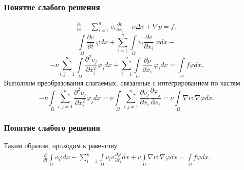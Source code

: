 \documentclass[10pt, pdf, hyperref={unicode}]{beamer}
\begin{document}
  \begin{frame}
    \frametitle{Понятие слабого решения}
    \begin{center}
      \begin{minipage}[h]{0.97\linewidth}
        \begin{equation*}
          \begin{gathered}
            \frac{\partial v}{\partial t}+\sum_{i=1}^nv_i\frac{\partial v}{\partial x_i}-\nu\Delta v+\nabla p=f;
          \end{gathered}
        \end{equation*}
        $$\int\limits_\Omega \frac{\partial v}{\partial t}\ \varphi dx+\sum_{i=1}^n\int\limits_\Omega v_i\frac{\partial v}{\partial x_i}\ \varphi dx-$$
        $$-\nu \sum_{i, j=1}^n\int\limits_\Omega\frac{\partial^2 v_j}{\partial x^{2}_i} \varphi_j dx+
        \sum_{i=1}^n\int\limits_\Omega \frac{\partial p}{\partial x_i}\ \varphi_idx=\int\limits_\Omega f\varphi dx.$$
        Выполним преобразования слагаемых, связанные с интегрированием по частям
        $$-\nu\int\limits_\Omega \sum_{i,j=1}^{n}\frac{\partial^2 v_j}{\partial x^{2}_i}\varphi_j dx=
        \nu\int\limits_\Omega\sum_{i, j=1}^{n}\frac{\partial v_j}{\partial x_i}\frac{\partial \varphi_j}{\partial x_i}=\nu\int\limits_\Omega \nabla v:\nabla\varphi dx.$$
      \end{minipage}
    \end{center}
  \end{frame}

  \begin{frame}
    \frametitle{Понятие слабого решения}
    \begin{center}
      \begin{minipage}[h]{0.97\linewidth}
        Таким образом, приходим к равенству
        \begin{equation}\label{eq:5.5}
          \begin{gathered}
            \frac{d}{dt}\int\limits_\Omega v \varphi dx-\sum_{i=1}^{n}\int\limits_\Omega v_i v
            \frac{\partial \varphi }{\partial x_i}dx + v\int\limits_\Omega \nabla v :\nabla\varphi dx
            =\int\limits_\Omega f\varphi dx.
          \end{gathered}
        \end{equation}
      \end{minipage}
    \end{center}
  \end{frame}
\end{document}
